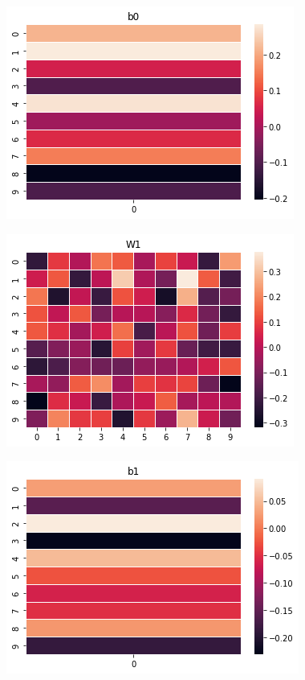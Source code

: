 \documentclass[]{article}
\begin{document}
\begin{center}
	\includegraphics[width=\linewidth]{Figures/b0.png}
\end{center}
\begin{center}
	\includegraphics[width=\linewidth]{Figures/W1.png}
\end{center}
\begin{center}
	\includegraphics[width=\linewidth]{Figures/b1.png}
\end{center}
\end{document}
